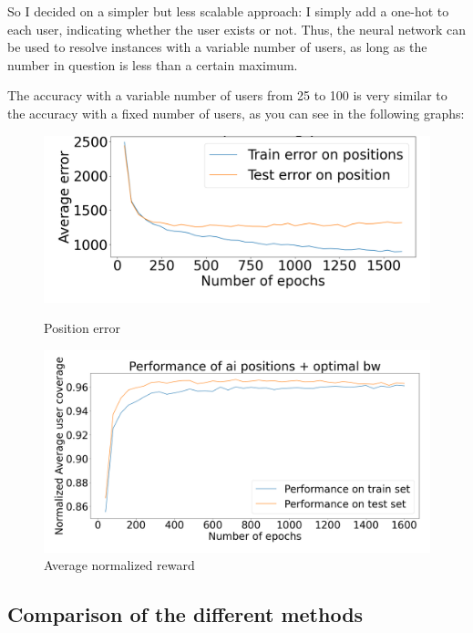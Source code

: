 \documentclass[letterpaper]{article}
\begin{document}
So I decided on a simpler but less scalable approach: I simply add a one-hot to each user, indicating whether the user exists or not.
Thus, the neural network can be used to resolve instances with a variable number of users, as long as the number in question is less than a certain maximum.

The accuracy with a variable number of users from 25 to 100 is very similar to the accuracy with a fixed number of users, as you can see in the following graphs:

\begin{figure}[H]
    \centering
    \begin{minipage}[b]{0.45\textwidth}
        \centering
        \includegraphics[width=\textwidth]{images/error_pos_variable_user_number.png}
        \caption{Position error}
    \end{minipage}
    \hspace{0.05\textwidth}
    \begin{minipage}[b]{0.45\textwidth}
        \centering
        \includegraphics[width=\textwidth]{images/reward_variable_user_number.png}
        \caption{Average normalized reward}
    \end{minipage}
\end{figure}

\subsection{Comparison of the different methods}
\end{document}
